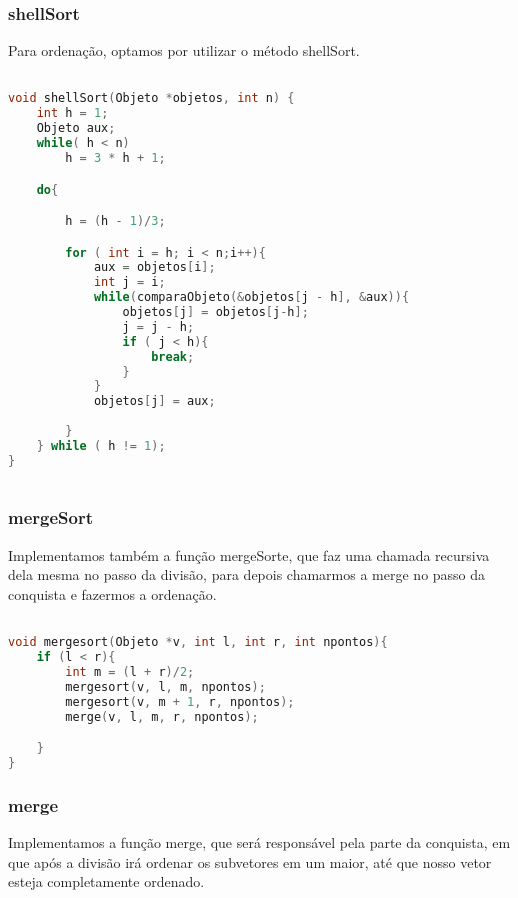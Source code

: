 \documentclass{article}
\begin{document}
\subsubsection{shellSort}

Para ordenação, optamos por utilizar o método shellSort.

\begin{lstlisting}[caption={Função shellSort},label={lst:cod7},language=C]

void shellSort(Objeto *objetos, int n) {
    int h = 1;
    Objeto aux;
    while( h < n)
        h = 3 * h + 1;

    do{

        h = (h - 1)/3;

        for ( int i = h; i < n;i++){
            aux = objetos[i]; 
            int j = i;
            while(comparaObjeto(&objetos[j - h], &aux)){
                objetos[j] = objetos[j-h];
                j = j - h;
                if ( j < h){
                    break;
                }
            }
            objetos[j] = aux;
            
        }
    } while ( h != 1); 
}
    
\end{lstlisting}


\subsubsection{mergeSort}

Implementamos também a função mergeSorte, que faz uma chamada recursiva dela mesma
no passo da divisão, para depois chamarmos a merge no passo da conquista e fazermos a ordenação.

\begin{lstlisting}[caption={Função mergeSort},label={lst:cod7},language=C]

void mergesort(Objeto *v, int l, int r, int npontos){
    if (l < r){
        int m = (l + r)/2;
        mergesort(v, l, m, npontos);
        mergesort(v, m + 1, r, npontos);
        merge(v, l, m, r, npontos);

    }
}

\end{lstlisting}



\subsubsection{merge}

Implementamos a função merge, que será responsável pela parte da conquista, em que após a divisão
irá ordenar os subvetores em um maior, até que nosso vetor esteja completamente ordenado.
\end{document}
